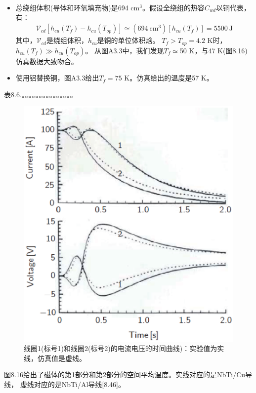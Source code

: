 \begin{itemize}
\item 总绕组体积(导体和环氧填充物)是694 $\mathrm{cm^3}$。假设全绕组的热容$C_{wd}$以铜代表，有：
\begin{align*}%
\mathcal{V}_{cd}[h_{cu}(T_f)-h_{cu}(T_{op})]\simeq(694\ \mathrm{cm^3})[h_{cu}(T_f)]=5500\ \mathrm{J}
\end{align*}
其中，$\mathcal{V}_{cd}$是绕组体积，$h_{cu}$是铜的单位体积焓。
$T_f>T_{op}=4.2$ K时，$h_{cu}(T_f)\gg h_{cu}(T_{op})$。
从图A3.3中，我们发现$T_f\simeq$50 K，与47 K(图8.16)仿真数据大致吻合。

\item 使用铝替换铜，图A3.3给出$T_f=75$ K。仿真给出的温度是57 K。
\end{itemize}



表8.6.。。。。。。。。。。。。。。。

\begin{figure}
	\centering
	\includegraphics[scale=0.5]{chpt8/figs/fig8.15.eps}
	\caption{线圈1(标号1)和线圈2(标号2)的电流电压的时间曲线)：实验值为实线，仿真值是虚线。 }
\end{figure}

图8.16给出了磁体的第1部分和第2部分的空间平均温度。实线对应的是NbTi/Cu导线，
虚线对应的是NbTi/Al导线[8.46]。

